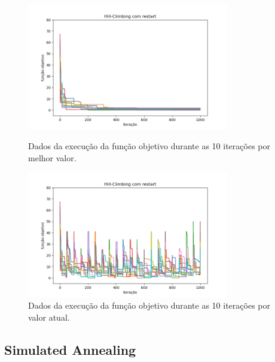 \begin{figure}[H]
\centering
  \begin{minipage}[b]{0.48\textwidth}
    \includegraphics[width=88mm]{imagens/otima/problema-2-hill-climbing-com-restart-funcao-objetivo-best.png}
    \caption{Dados da execução da função objetivo durante as 10 iterações por melhor valor.
    \label{fig:problema-2-hill-climbing-com-restart-funcao-objetivo-best}}
  \end{minipage}
  \hfill
  \begin{minipage}[b]{0.48\textwidth}
    \includegraphics[width=88mm]{imagens/otima/problema-2-hill-climbing-com-restart-funcao-objetivo-value.png}
    \caption{Dados da execução da função objetivo durante as 10 iterações por valor atual.
    \label{fig:problema-2-hill-climbing-com-restart-funcao-objetivo-value}}
  \end{minipage}
\end{figure}

\subsection{Simulated Annealing}

